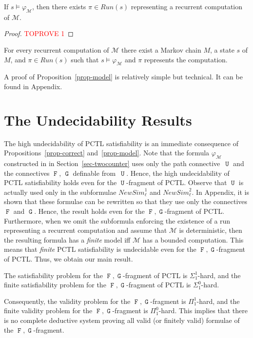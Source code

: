 \documentclass[a4paper,UKenglish,cleveref, autoref, thm-restate]{lipics-v2021}
\newcommand{\M}{\mathcal{M}}
\newcommand{\run}{\textit{Run}}
\newcommand{\NewSimulate}{\mathit{NewSim}}
\newcommand{\fp}{Appendix}
\newcommand*{\opu}{\operatorname{\pmb{\mathtt{U}}}}
\newcommand*{\opf}{\operatorname{\pmb{\mathtt{F}}}}
\newcommand*{\opg}{\operatorname{\pmb{\mathtt{G}}}}
\begin{document}
\begin{proposition}
\label{prop-correct}
    If $s \models \varphi_\M$, then there exists $\pi \in \run(s)$ representing a recurrent computation of $\M$.
\end{proposition}
\begin{proof}\textcolor{red}{TOPROVE 1}\end{proof}


\begin{proposition}
\label{prop-model}
    For every recurrent computation of $\M$ there exist a Markov chain $M$, a state $s$ of $M$, and $\pi \in \run(s)$ such that $s \models \varphi_\M$ and $\pi$ represents the computation.
\end{proposition}
A proof of Proposition~\ref{prop-model} is relatively simple but technical. 
It can be found in \fp.
 
\section{The Undecidability Results}

The high undecidability of PCTL satisfiability is an immediate consequence of Propositions~\ref{prop-correct} and~\ref{prop-model}. Note that the 
formula $\varphi_\M$ constructed in in Section~\ref{sec-twocounter} uses only the path connective~$\opu$ and the connectives $\opf$, $\opg$ definable from~$\opu$. Hence, the high undecidability of PCTL satisfiability holds even for the $\opu$-fragment of PCTL. Observe that $\opu$ is actually used only in the subformulae $\NewSimulate_\ell^1$ and $\NewSimulate_\ell^2$. In \fp, it is shown that these formulae can be rewritten so that they use only the connectives $\opf$ and $\opg$. Hence, the result holds even for the $\opf,\opg$-fragment of PCTL.
Furthermore, when we omit the subformula enforcing the existence of a run representing a recurrent computation and assume that $\M$ is deterministic, then the resulting formula has a \emph{finite} model iff $\M$ has a bounded computation. This means that \emph{finite} PCTL satisfiability is undecidable even for the $\opf,\opg$-fragment of PCTL. Thus, we obtain our main result.

\begin{theorem}   
The satisfiability problem for the $\opf,\opg$-fragment of PCTL is $\Sigma_1^1$-hard, and the finite satisfiability problem for the $\opf,\opg$-fragment of PCTL is $\Sigma_1^0$-hard. 
\end{theorem}
Consequently, the validity problem for the $\opf,\opg$-fragment is $\Pi_1^1$-hard, and the finite validity problem for the $\opf,\opg$-fragment is $\Pi_1^0$-hard. This implies that there is no complete deductive system proving all valid (or finitely valid) formulae of the $\opf,\opg$-fragment.
\end{document}
